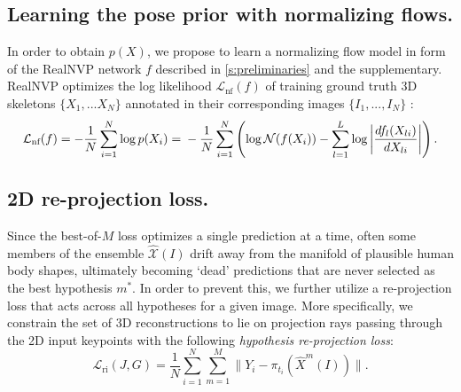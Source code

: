 
\subsection{Learning the pose prior with normalizing flows.}
In order to obtain $p(X)$, we propose to learn a normalizing flow model in form of
the RealNVP network $f$ described in \cref{s:preliminaries} and the supplementary. RealNVP optimizes the log likelihood $\mathcal{L}_\text{nf}(f)$ of training ground truth 3D skeletons $\{X_1, ... X_N\}$ annotated in their corresponding images $\{I_1, ..., I_N\}$ :
\begin{equation}\label{e:loglik}
\mathcal{L}_\text{nf}(f)
=
-
\frac{1}{N}
\sum_{i=1}^N
\log p(X_i)
=\\
-
\frac{1}{N}
\sum_{i=1}^N
\left(
\log \mathcal{N}(f(X_i))
-
\sum_{l=1}^L
\log
\left|
\frac{d f_l(X_{li})}{d X_{li}}
\right|
\right).
\end{equation}

\subsection{2D re-projection loss.}

Since the best-of-$M$ loss optimizes a single prediction at a time, often some members of the ensemble $\mathcal{\hat X}(I)$ drift away from the manifold of plausible human body shapes, ultimately becoming `dead' predictions that are never selected as the best hypothesis $m^*$.
In order to prevent this, we further utilize a re-projection loss that acts across all hypotheses for a given image.
More specifically, we constrain the set of 3D reconstructions to lie on projection rays passing through the 2D input keypoints with the following \emph{hypothesis re-projection loss}:
\begin{equation}\label{e:loss-ri}
  \mathcal{L}_\text{ri}(J,G)
  =
  \frac{1}{N}
  \sum_{i=1}^N
  \sum_{m=1}^M
  \big \| Y_i - \pi_{t_{i}}(\hat X^m(I)) \big \|.
\end{equation}

